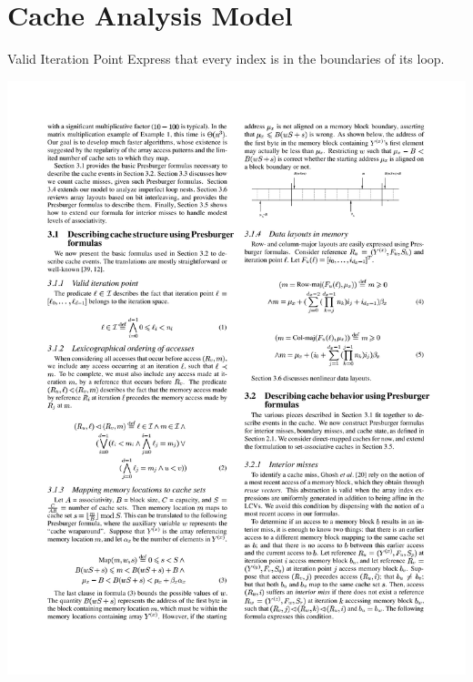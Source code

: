 \documentclass{beamer}
\begin{document}
\section{Cache Analysis Model}

\begin{frame}{Valid Iteration Point}
  Express that every index is in the boundaries of its loop.
  \begin{center}
    \includegraphics[scale=1.1]{eq1}
  \end{center}
\end{frame}
\end{document}
